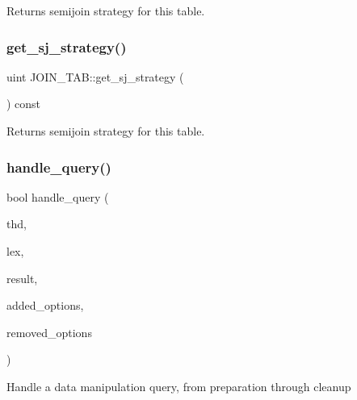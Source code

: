 \begin{DoxyReturn}{Returns}
semijoin strategy for this table. 
\end{DoxyReturn}
\mbox{\label{group__Query__Optimizer_gabc77304fe7c751bce4fa59ef52d91fb0}} 
\subsubsection{\texorpdfstring{get\+\_\+sj\+\_\+strategy()}{get\_sj\_strategy()}\hspace{0.1cm}{\footnotesize\ttfamily [2/2]}}
{\footnotesize\ttfamily uint J\+O\+I\+N\+\_\+\+T\+A\+B\+::get\+\_\+sj\+\_\+strategy (\begin{DoxyParamCaption}{ }\end{DoxyParamCaption}) const}

\begin{DoxyReturn}{Returns}
semijoin strategy for this table. 
\end{DoxyReturn}
\mbox{\label{group__Query__Optimizer_gae77d58d476f44178e469e2cbe16e9e01}} 
\subsubsection{\texorpdfstring{handle\+\_\+query()}{handle\_query()}}
{\footnotesize\ttfamily bool handle\+\_\+query (\begin{DoxyParamCaption}\item[{T\+HD $\ast$}]{thd,  }\item[{L\+EX $\ast$}]{lex,  }\item[{Query\+\_\+result $\ast$}]{result,  }\item[{ulonglong}]{added\+\_\+options,  }\item[{ulonglong}]{removed\+\_\+options }\end{DoxyParamCaption})}

Handle a data manipulation query, from preparation through cleanup


